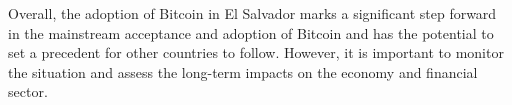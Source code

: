 Overall, the adoption of Bitcoin in El Salvador marks a significant step forward in the mainstream acceptance and adoption of Bitcoin and has the potential to set a precedent for other countries to follow. However, it is important to monitor the situation and assess the long-term impacts on the economy and financial sector.